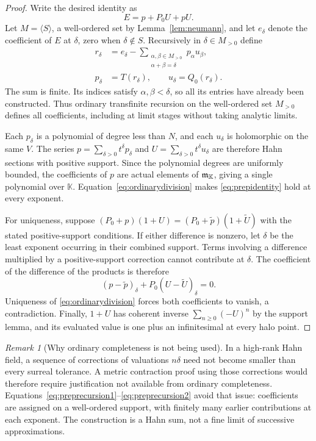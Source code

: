 \documentclass[11pt,a4paper]{article}
\theoremstyle{definition}\newtheorem{definition}[theorem]{Definition}
\theoremstyle{remark}\newtheorem{remark}[theorem]{Remark}
\newcommand{\K}{\mathbb K}
\numberwithin{equation}{section}
\begin{document}
\begin{proof}
Write the desired identity as
\begin{equation}\label{eq:prepidentity}
 E=p+P_0U+pU.
\end{equation}
Let $M=\langle S\rangle$, a well-ordered set by Lemma~\ref{lem:neumann}, and let $e_\delta$ denote the coefficient of $E$ at $\delta$, zero when $\delta\notin S$. Recursively in $\delta\in M_{>0}$ define
\begin{align}
 r_\delta&=e_\delta-
       \sum_{\substack{\alpha,\beta\in M_{>0}\\\alpha+\beta=\delta}}
              p_\alpha u_\beta,\label{eq:preprecursion1}\\
 p_\delta&=T(r_\delta),\qquad
 u_\delta=Q_0(r_\delta).\label{eq:preprecursion2}
\end{align}
The sum is finite. Its indices satisfy $\alpha,\beta<\delta$, so all its entries have already been constructed. Thus ordinary transfinite recursion on the well-ordered set $M_{>0}$ defines all coefficients, including at limit stages without taking analytic limits.

Each $p_\delta$ is a polynomial of degree less than $N$, and each $u_\delta$ is holomorphic on the same $V$. The series
$p=\sum_{\delta>0}t^\delta p_\delta$ and
$U=\sum_{\delta>0}t^\delta u_\delta$ are therefore Hahn sections with positive support. Since the polynomial degrees are uniformly bounded, the coefficients of $p$ are actual elements of $\infinit$, giving a single polynomial over $\K$. Equation~\eqref{eq:ordinarydivision} makes \eqref{eq:prepidentity} hold at every exponent.

For uniqueness, suppose $(P_0+p)(1+U)=(P_0+\widetilde p)(1+\widetilde U)$ with the stated positive-support conditions. If either difference is nonzero, let $\delta$ be the least exponent occurring in their combined support. Terms involving a difference multiplied by a positive-support correction cannot contribute at $\delta$. The coefficient of the difference of the products is therefore
\[
 (p-\widetilde p)_\delta+P_0(U-\widetilde U)_\delta=0.
\]
Uniqueness of \eqref{eq:ordinarydivision} forces both coefficients to vanish, a contradiction. Finally, $1+U$ has coherent inverse $\sum_{n\geq0}(-U)^n$ by the support lemma, and its evaluated value is one plus an infinitesimal at every halo point.
\end{proof}

\begin{remark}[Why ordinary completeness is not being used]
In a high-rank Hahn field, a sequence of corrections of valuations $n\delta$ need not become smaller than every surreal tolerance. A metric contraction proof using those corrections would therefore require justification not available from ordinary completeness. Equations~\eqref{eq:preprecursion1}--\eqref{eq:preprecursion2} avoid that issue: coefficients are assigned on a well-ordered support, with finitely many earlier contributions at each exponent. The construction is a Hahn sum, not a fine limit of successive approximations.
\end{remark}
\end{document}
